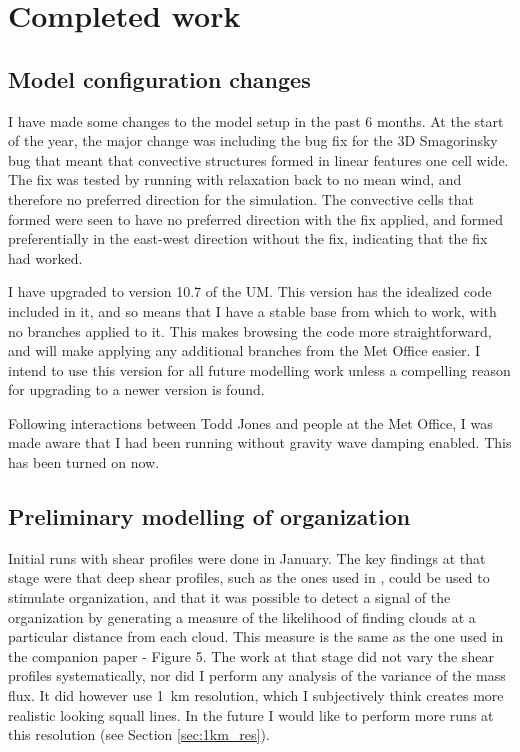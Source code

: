 \documentclass[11pt,a4paper]{article}
\newcommand\todo[1]{\textbf{TODO: #1}}
\begin{document}

\section{Completed work}

\subsection{Model configuration changes}
\label{sec:modelling_config}

I have made some changes to the model setup in the past 6 months. At the start of the year, the major change was including the bug fix for the 3D Smagorinsky bug that meant that convective structures formed in linear features one cell wide. The fix was tested by running with relaxation back to no mean wind, and therefore no preferred direction for the simulation. The convective cells that formed were seen to have no preferred direction with the fix applied, and formed preferentially in the east-west direction without the fix, indicating that the fix had worked.

I have upgraded to version 10.7 of the UM. This version has the idealized code included in it, and so means that I have a stable base from which to work, with no branches applied to it. This makes browsing the code more straightforward, and will make applying any additional branches from the Met Office easier. I intend to use this version for all future modelling work unless a compelling reason for upgrading to a newer version is found.

Following interactions between Todd Jones and people at the Met Office, I was made aware that I had been running without gravity wave damping enabled. This has been turned on now.



\subsection{Preliminary modelling of organization}
\label{sec:prelim_modelling}

Initial runs with shear profiles were done in January. The key findings at that stage were that deep shear profiles, such as the ones used in \cite{cohen2006fluctuations}, could be used to stimulate organization, and that it was possible to detect a signal of the organization by generating a measure of the likelihood of finding clouds at a particular distance from each cloud. This measure is the same as the one used in the companion paper \cite{muetz2017effects} - Figure 5. The work at that stage did not vary the shear profiles systematically, nor did I perform any analysis of the variance of the mass flux. It did however use \SI{1}{km} resolution, which I subjectively think creates more realistic looking squall lines. In the future I would like to perform more runs at this resolution (see Section \ref{sec:1km_res}).
\end{document}

